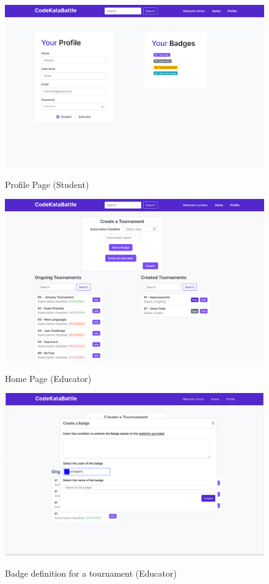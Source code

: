 \documentclass{Configuration_Files/Template}
\begin{document}
\begin{figure}[H]
\centering
\includegraphics[scale = 0.25]{DD_latex/Images/UI/Profile_Student.png}\\
\caption{Profile Page (Student) }
\end{figure}

\begin{figure}[H]
\centering
\includegraphics[scale = 0.25]{DD_latex/Images/UI/MainPageEducator.png}\\
\caption{Home Page (Educator)}
\end{figure}

\begin{figure}[H]
\centering
\includegraphics[scale = 0.25]{DD_latex/Images/UI/MainPageEducator-1.png}\\
\caption{Badge definition for a tournament (Educator)}
\end{figure}
\end{document}
